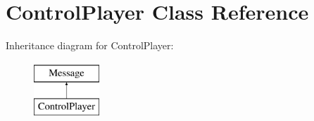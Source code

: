 \hypertarget{class_control_player}{\section{Control\-Player Class Reference}
\label{class_control_player}
}
Inheritance diagram for Control\-Player\-:\begin{figure}[H]
\begin{center}
\leavevmode
\includegraphics[height=2.000000cm]{class_control_player}
\end{center}
\end{figure}
